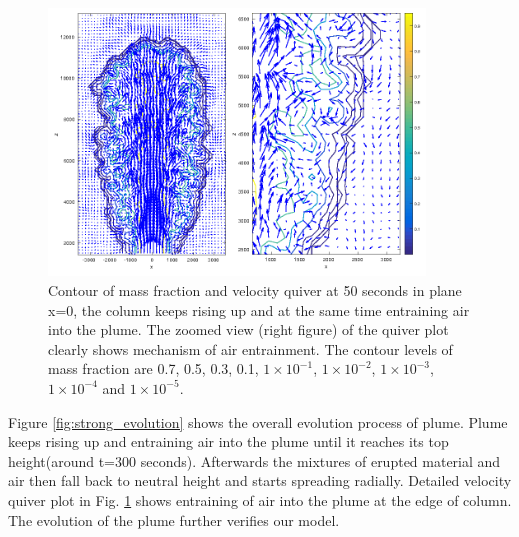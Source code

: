 \documentclass[journal abbreviation, manuscript]{copernicus}
\begin{document}
\begin{figure}
\includegraphics[width=10cm]{t50}
\caption{Contour of mass fraction and velocity quiver at 50 seconds in plane x=0, the column keeps rising up and at the same time entraining air into the plume. The zoomed view (right figure) of the quiver plot clearly shows mechanism of air entrainment. The contour levels of mass fraction are 0.7, 0.5, 0.3, 0.1, $1\times 10 ^{-1}$, $1\times 10 ^{-2}$, $1\times 10 ^{-3}$, $1\times 10^{-4}$ and $1\times 10^{-5}$.}
\label{fig:strong_plume_t50}
\end{figure}

Figure \ref{fig:strong_evolution} shows the overall evolution process of plume. Plume keeps rising up and entraining air into the plume until it reaches its top height(around t=300 seconds). Afterwards the mixtures of erupted material and air then fall back to neutral height and starts spreading radially. Detailed velocity quiver plot in Fig. \ref{fig:strong_plume_t50} shows entraining of air into the plume at the edge of column. The evolution of the plume further verifies our model.
%
\end{document}
